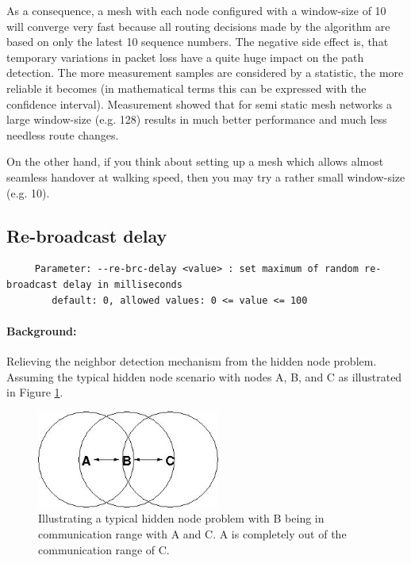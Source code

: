 \documentclass[11pt]{article}
\begin{document}
As a consequence, a mesh with each node configured with a window-size of 10 will converge very fast because all routing decisions made by the algorithm are based on only the latest 10 sequence numbers. The negative side effect is, that temporary variations in packet loss have a quite huge impact on the path detection. The more measurement samples are considered by a statistic, the more reliable it becomes (in mathematical terms this can be expressed with the confidence interval). Measurement showed that for semi static mesh networks a large window-size (e.g. 128) results in much better performance and much less needless route changes.

On the other hand, if you think about setting up a mesh which allows almost seamless handover at walking speed, then you may try a rather small window-size (e.g. 10).


\subsection{Re-broadcast delay}

\begin{small}
\begin{verbatim}
     Parameter: --re-brc-delay <value> : set maximum of random re-broadcast delay in milliseconds
        default: 0, allowed values: 0 <= value <= 100
\end{verbatim}
\end{small}

\paragraph{Background:} Relieving the neighbor detection mechanism from the hidden node problem.
%
Assuming the typical hidden node scenario with nodes A, B, and C as illustrated in Figure \ref{fig:hiddenNode}.

\begin{figure}[htbp]
  \begin{center}
    \includegraphics[width=6cm]{hiddenNode-x01.jpg}
    \caption{Illustrating a typical hidden node problem with B being in communication range with A and C.  A is completely out of the communication range of C.}
    \label{fig:hiddenNode}
  \end{center}
\end{figure}
\end{document}
